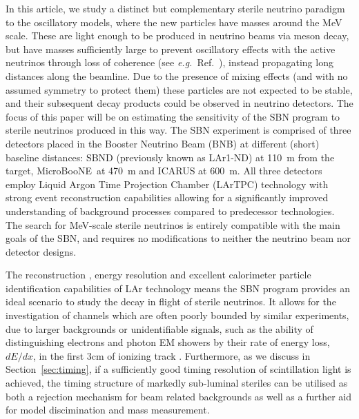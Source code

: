 \documentclass[11pt, a4paper]{article}
\newcommand{\refsec}[1]{Section~\ref{#1}}
\newcommand{\refref}[1]{Ref.~\cite{#1}}
\def\eg{\emph{e.g.}}
\def\muboone{MicroBooNE}
\newcounter{CommentCount}
\newcommand{\marcom}[2]{\textsuperscript{\textcolor{#1}{\theCommentCount}}\marginpar{\textsuperscript{\textcolor{#1}{\theCommentCount}}\textcolor{#1}{{\small#1: #2}}}\stepcounter{CommentCount}}
\begin{document}
In this article, we study a distinct but complementary sterile neutrino
paradigm to the oscillatory models, where the new particles have masses around
the MeV scale. These are light enough to be produced in neutrino beams via
meson decay, but have masses sufficiently large to prevent oscillatory effects
with the active neutrinos through loss of coherence (see \eg\
\refref{Akhmedov:2009rb}), instead propagating long distances along the
beamline. Due to the presence of mixing effects (and with no assumed symmetry
to protect them) these particles are not expected to be stable, and their
subsequent decay products could be observed in neutrino detectors.
%
%
The focus of this paper will be on estimating the sensitivity of the
SBN program to sterile neutrinos produced in this way.
%
The SBN experiment is comprised of three detectors placed in the Booster
Neutrino Beam (BNB) at different (short) baseline distances: SBND (previously
known as LAr1-ND) at 110~m from the target, \muboone\ at 470~m and ICARUS at
600~m.  All three detectors employ Liquid Argon Time Projection Chamber
(LArTPC) technology \cite{Rubbia:1977} with strong event reconstruction
capabilities allowing for a significantly improved understanding of background
processes compared to predecessor technologies. 
%
The search for MeV-scale sterile neutrinos is entirely compatible with the main
goals of the SBN, and requires no modifications to neither the neutrino beam
nor detector designs. 
%
%
%

The reconstruction \cite{Church:2013hea, Marshall:2015rfa}, energy resolution
\cite{Sorel:2014rka} and excellent calorimeter particle identification
capabilities of LAr \cite{Antonello:2012hu} technology means the SBN program
provides an ideal scenario to study the decay in flight of sterile neutrinos.
It allows for the investigation of channels which are often poorly bounded by
similar experiments, due to larger backgrounds or unidentifiable signals, such
as the ability of distinguishing electrons and photon EM showers by their rate
of energy loss, $dE/dx$, in the first 3cm of ionizing track \cite{szelc:2007}.
Furthermore, as we discuss in \refsec{sec:timing}, if a sufficiently good timing
resolution of scintillation light is achieved, the timing structure of markedly
sub-luminal steriles can be utilised as both a rejection mechanism for beam
related backgrounds as well as a further aid for model discimination and mass
measurement.
\end{document}
